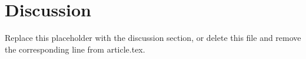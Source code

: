 \section{Discussion}
\label{sec:discussion}



Replace this placeholder with the discussion section, or delete this file
and remove the corresponding \verb|| line from article.tex.
